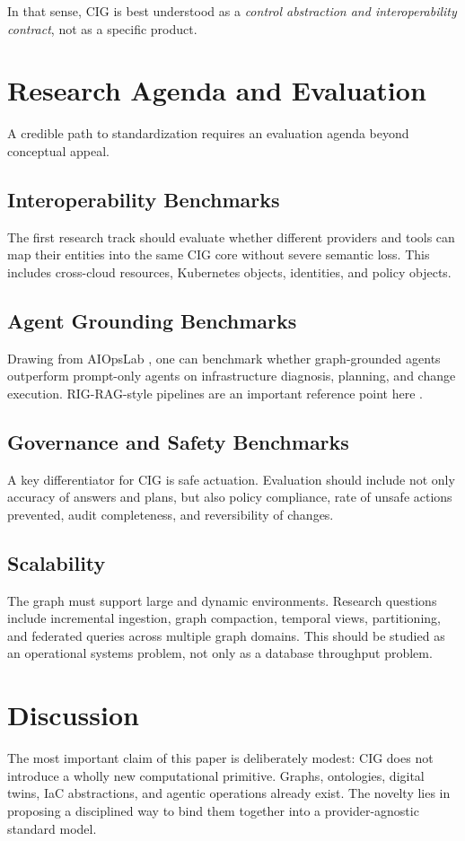 \documentclass[conference]{IEEEtran}
\begin{document}
In that sense, CIG is best understood as a \emph{control abstraction and interoperability contract}, not as a specific product.

\section{Research Agenda and Evaluation}
A credible path to standardization requires an evaluation agenda beyond conceptual appeal.

\subsection{Interoperability Benchmarks}
The first research track should evaluate whether different providers and tools can map their entities into the same CIG core without severe semantic loss. This includes cross-cloud resources, Kubernetes objects, identities, and policy objects.

\subsection{Agent Grounding Benchmarks}
Drawing from AIOpsLab \cite{chen2025aiopslab}, one can benchmark whether graph-grounded agents outperform prompt-only agents on infrastructure diagnosis, planning, and change execution. RIG-RAG-style pipelines are an important reference point here \cite{rigrag2025}.

\subsection{Governance and Safety Benchmarks}
A key differentiator for CIG is safe actuation. Evaluation should include not only accuracy of answers and plans, but also policy compliance, rate of unsafe actions prevented, audit completeness, and reversibility of changes.

\subsection{Scalability}
The graph must support large and dynamic environments. Research questions include incremental ingestion, graph compaction, temporal views, partitioning, and federated queries across multiple graph domains. This should be studied as an operational systems problem, not only as a database throughput problem.

\section{Discussion}
The most important claim of this paper is deliberately modest: CIG does not introduce a wholly new computational primitive. Graphs, ontologies, digital twins, IaC abstractions, and agentic operations already exist. The novelty lies in proposing a disciplined way to bind them together into a provider-agnostic standard model.
\end{document}

